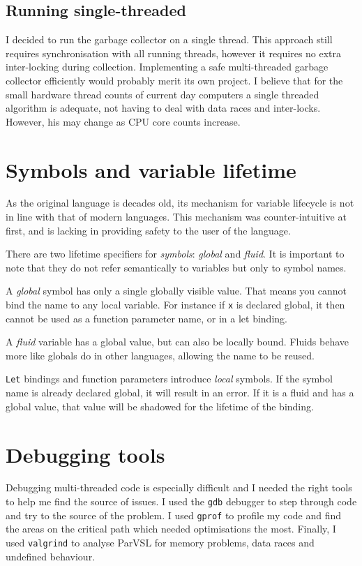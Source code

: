 \subsection{Running single-threaded}

I decided to run the garbage collector on a single thread. This approach still requires synchronisation with all running
threads, however it requires no extra inter-locking during collection. Implementing a safe multi-threaded garbage collector
efficiently would probably merit its own project. I believe that for the small hardware thread counts of current day computers
a single threaded algorithm is adequate, not having to deal with data races and inter-locks. However, his may change as
CPU core counts increase.

\section{Symbols and variable lifetime}
As the original language is decades old, its mechanism for variable lifecycle is not in line with that of modern languages.
This mechanism was counter-intuitive at first, and is lacking in providing safety to the user of the language.

There are two lifetime specifiers for \emph{symbols}: \emph{global} and \emph{fluid}. It is important to note that they
do not refer semantically to variables but only to symbol names.

A \emph{global} symbol has only a single globally visible value. That means you cannot bind the name to any local
variable. For instance if \texttt{x} is declared global, it then cannot be used as a function parameter name, or in a
let binding.

A \emph{fluid} variable has a global value, but can also be locally bound. Fluids behave more like globals do
in other languages, allowing the name to be reused.

\texttt{Let} bindings and function parameters introduce \emph{local} symbols. If the symbol name is already declared global,
it will result in an error. If it is a fluid and has a global value, that value will be shadowed for the lifetime
of the binding.

\section{Debugging tools}

Debugging multi-threaded code is especially difficult and I
needed the right tools to help me find the source of issues. I used
the \verb|gdb| \cite{gdb} debugger to step through code and try to the source
of the problem. I used \verb|gprof| \cite{gprof} to profile my code and find
the areas on the critical path which needed optimisations the most. Finally,
I used \verb|valgrind| \cite{valgrind} to analyse ParVSL for memory
problems, data races and undefined behaviour.
